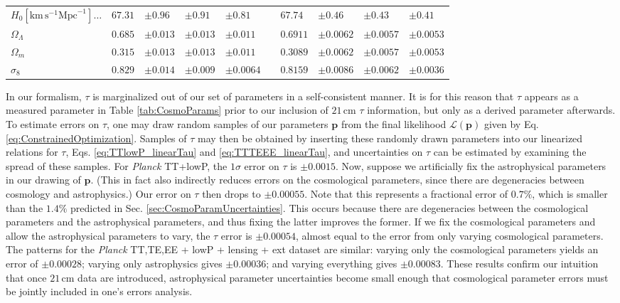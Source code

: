 \documentclass[twocolumn,aps,prd,nofootinbib,showpacs]{revtex4-1}
\begin{document}
\begin{table}
\begin{ruledtabular}
\begin{tabular}{lllllcllll}
$H_0 \left[ \textrm{km}\,\textrm{s}^{-1}\textrm{Mpc}^{-1}\right] \dots$ \dotfill & $67.31 $&$\pm 0.96$ & $\pm0.91$ &  $\pm 0.81$ && $67.74 $&$\pm 0.46$ & $\pm 0.43$ &  $\pm 0.41$ \\
$\Omega_\Lambda$ \dotfill & $0.685 $&$\pm 0.013$ &  $ \pm 0.013$ &  $\pm 0.011$ && $0.6911$& $ \pm 0.0062$ & $\pm 0.0057$ &  $\pm 0.0053$ \\
$\Omega_m$ \dotfill & $0.315$& $ \pm 0.013$ &   $ \pm 0.013$ & $\pm 0.011$&& $0.3089 $&$\pm 0.0062$ & $\pm 0.0057$ &  $\pm 0.0053$  \\
$\sigma_8$ \dotfill & $0.829$&$ \pm 0.014$ & $\pm 0.009$ & $\mathbf{\pm 0.0064}$ && $0.8159$& $ \pm 0.0086$ & $\pm 0.0062$ &  $\mathbf{\pm 0.0036}$\\
\end{tabular}
\end{ruledtabular}
\end{table}

In our formalism, $\tau$ is marginalized out of our set of parameters in a self-consistent manner. It is for this reason that $\tau$ appears as a measured parameter in Table \ref{tab:CosmoParams} prior to our inclusion of $21\,\textrm{cm}$ $\tau$ information, but only as a derived parameter afterwards. To estimate errors on $\tau$, one may draw random samples of our parameters $\mathbf{p}$ from the final likelihood $\mathcal L (\mathbf{p})$ given by Eq. \eqref{eq:ConstrainedOptimization}. Samples of $\tau$ may then be obtained by inserting these randomly drawn parameters into our linearized relations for $\tau$, Eqs. \eqref{eq:TTlowP_linearTau} and \eqref{eq:TTTEEE_linearTau}, and uncertainties on $\tau$ can be estimated by examining the spread of these samples. For \emph{Planck} TT+lowP, the $1\sigma$ error on $\tau$ is $\pm 0.0015$. Now, suppose we artificially fix the astrophysical parameters in our drawing of $\mathbf{p}$. (This in fact also indirectly reduces errors on the cosmological parameters, since there are degeneracies between cosmology and astrophysics.) Our error on $\tau$ then drops to $\pm 0.00055$. Note that this represents a fractional error of $0.7\%$, which is smaller than the $1.4\%$ predicted in Sec. \ref{sec:CosmoParamUncertainties}. This occurs because there are degeneracies between the cosmological parameters and the astrophysical parameters, and thus fixing the latter improves the former. If we fix the cosmological parameters and allow the astrophysical parameters to vary, the $\tau$ error is $\pm 0.00054$, almost equal to the error from only varying cosmological parameters. The patterns for the \emph{Planck} TT,TE,EE + lowP + lensing + ext dataset are similar: varying only the cosmological parameters yields an error of $\pm 0.00028$; varying only astrophysics gives $\pm 0.00036$; and varying everything gives $\pm 0.00083$. These results confirm our intuition that once $21\,\textrm{cm}$ data are introduced, astrophysical parameter uncertainties become small enough that cosmological parameter errors must be jointly included in one's errors analysis.
\end{document}
